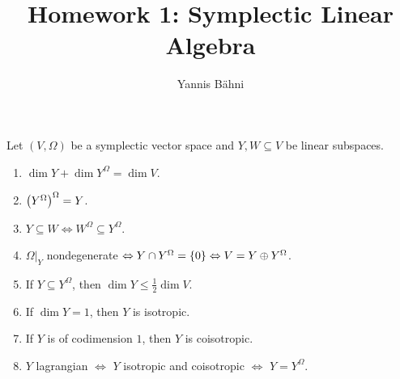 

\title{Homework 1: Symplectic Linear Algebra}
\author{Yannis B\"ahni}
\address[Yannis B\"ahni]{University of Zurich, R\"amistrasse 71, 8006 Zurich}



\maketitle
\thispagestyle{fancy}
\setcounter{section}{1}

\begin{exercise}
Let $(V,\Omega)$ be a symplectic vector space and $Y,W \subseteq V$ be linear subspaces.
\begin{enumerate}[label = \textup{(}\alph*\textup{)}]
\item $\dim Y + \dim Y^\Omega = \dim V$.
\item $\del[1]{Y^\Omega}^\Omega = Y$.
\item $Y \subseteq W \Leftrightarrow W^\Omega \subseteq Y^\Omega$.
\item $\Omega\vert_{Y}$ nondegenerate $\Leftrightarrow Y \cap Y^\Omega = \cbr[0]{0} \Leftrightarrow V = Y \oplus Y^\Omega$.
\item If $Y \subseteq Y^\Omega$, then $\dim Y \leq \frac{1}{2}\dim V$.
\item If $\dim Y = 1$, then $Y$ is isotropic.
\item If $Y$ is of codimension $1$, then $Y$ is coisotropic. 
\item $Y$ lagrangian $\Leftrightarrow$ $Y$ isotropic and coisotropic $\Leftrightarrow$ $Y = Y^\Omega$.
\end{enumerate}
\end{exercise}


